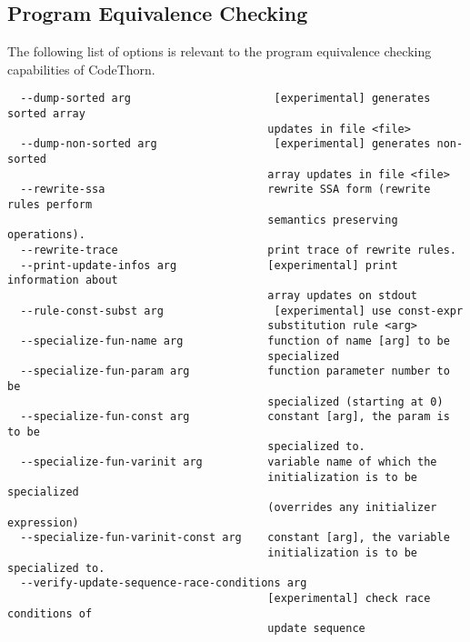 \documentclass[natbib]{article}
\begin{document}
\subsection{Program Equivalence Checking}
The following list of options is relevant to the program equivalence checking capabilities of CodeThorn.
\begin{verbatim}
  --dump-sorted arg                      [experimental] generates sorted array 
                                        updates in file <file>
  --dump-non-sorted arg                  [experimental] generates non-sorted 
                                        array updates in file <file>
  --rewrite-ssa                         rewrite SSA form (rewrite rules perform
                                        semantics preserving operations).
  --rewrite-trace                       print trace of rewrite rules.
  --print-update-infos arg              [experimental] print information about 
                                        array updates on stdout
  --rule-const-subst arg                 [experimental] use const-expr 
                                        substitution rule <arg>
  --specialize-fun-name arg             function of name [arg] to be 
                                        specialized
  --specialize-fun-param arg            function parameter number to be 
                                        specialized (starting at 0)
  --specialize-fun-const arg            constant [arg], the param is to be 
                                        specialized to.
  --specialize-fun-varinit arg          variable name of which the 
                                        initialization is to be specialized 
                                        (overrides any initializer expression)
  --specialize-fun-varinit-const arg    constant [arg], the variable 
                                        initialization is to be specialized to.
  --verify-update-sequence-race-conditions arg
                                        [experimental] check race conditions of
                                        update sequence

\end{verbatim}
\end{document}
